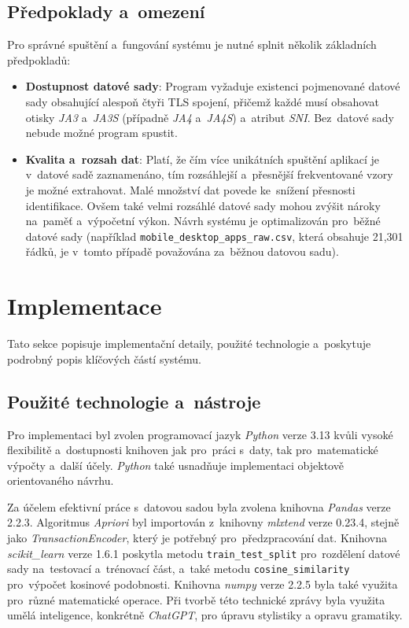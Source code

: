 \subsection{Předpoklady a~omezení}
Pro správné spuštění a~fungování systému je nutné splnit několik základních předpokladů:
\begin{itemize}
	\item \textbf{Dostupnost datové sady}: Program vyžaduje existenci pojmenované datové sady obsahující alespoň čtyři TLS spojení, přičemž každé musí obsahovat otisky \textit{JA3} a~\textit{JA3S} (případně \textit{JA4} a~\textit{JA4S}) a~atribut \textit{SNI}. Bez~datové sady nebude možné program spustit.
	\item \textbf{Kvalita a~rozsah dat}: Platí, že čím více unikátních spuštění aplikací je v~datové sadě zaznamenáno, tím rozsáhlejší a~přesnější frekventované vzory je možné extrahovat. Malé množství dat povede ke~snížení přesnosti identifikace. Ovšem také velmi rozsáhlé datové sady mohou zvýšit nároky na~paměť a~výpočetní výkon. Návrh systému je optimalizován pro~běžné datové sady (například \texttt{mobile\_desktop\_apps\_raw.csv}, která obsahuje 21,301 řádků, je v~tomto případě považována za~běžnou datovou sadu).
\end{itemize}

\section{Implementace}
Tato sekce popisuje implementační detaily, použité technologie a~poskytuje podrobný popis klíčových částí systému.

\subsection{Použité technologie a~nástroje}
Pro implementaci byl zvolen programovací jazyk \textit{Python} verze 3.13 kvůli vysoké flexibilitě a~dostupnosti knihoven jak pro~práci s~daty, tak pro~matematické výpočty a~další účely. \textit{Python} také usnadňuje implementaci objektově orientovaného návrhu.

Za účelem efektivní práce s~datovou sadou byla zvolena knihovna \textit{Pandas} verze 2.2.3. Algoritmus \textit{Apriori} byl importován z~knihovny \textit{mlxtend} verze 0.23.4, stejně jako \textit{TransactionEncoder}, který je potřebný pro~předzpracování dat. Knihovna \textit{scikit\_learn} verze 1.6.1 poskytla metodu \texttt{train\_test\_split} pro~rozdělení datové sady na~testovací a~trénovací část, a~také metodu \texttt{cosine\_similarity} pro~výpočet kosinové podobnosti. Knihovna \textit{numpy} verze 2.2.5 byla také využita pro~různé matematické operace. Při tvorbě této technické zprávy byla využita umělá inteligence, konkrétně \textit{ChatGPT}, pro úpravu stylistiky a opravu gramatiky.


